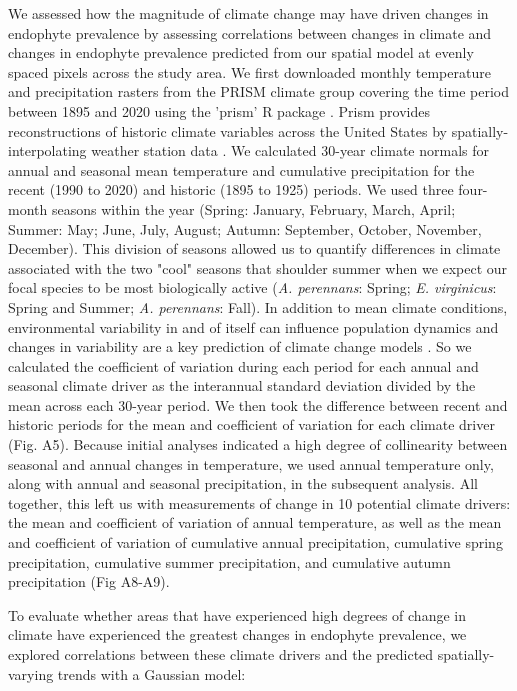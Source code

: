 \documentclass[11pt]{article}
\let\cite\citep
\begin{document}
We assessed how the magnitude of climate change may have driven changes in endophyte prevalence by assessing correlations between changes in climate and changes in endophyte prevalence predicted from our spatial model at evenly spaced pixels across the study area.
We first downloaded monthly temperature and precipitation rasters from the PRISM climate group \citep{daly2013prism} covering the time period between 1895 and 2020 using the 'prism' R package \citep{Rprism2015}. 
Prism provides reconstructions of historic climate variables across the United States by spatially-interpolating weather station data \citep{diLuzio2008constructing}. 
We calculated 30-year climate normals for annual and seasonal mean temperature and cumulative precipitation for the recent (1990 to 2020) and historic (1895 to 1925) periods.
We used three four-month seasons within the year (Spring: January, February, March, April; Summer: May; June, July, August; Autumn: September, October, November, December). 
This division of seasons allowed us to quantify differences in climate associated with the two "cool" seasons  that shoulder summer when we expect our focal species to be most biologically active (\emph{A. perennans}: Spring; \emph{E. virginicus}: Spring and Summer; \emph{A. perennans}: Fall). 
In addition to mean climate conditions, environmental variability  in and of itself can influence population dynamics \cite{tuljapurkar_population_1982} and changes in variability are a key prediction of climate change models \cite{stocker2013technical, ipcc_2021}.
So we calculated the coefficient of variation during each period for each annual and seasonal climate driver as the interannual standard deviation divided by the mean across each 30-year period.
We then took the difference between recent and historic periods for the mean and coefficient of variation for each climate driver (Fig. A5).
Because initial analyses indicated a high degree of collinearity between seasonal and annual changes in temperature, we used annual temperature only, along with annual and seasonal precipitation, in the subsequent analysis.
All together, this left us with measurements of change in 10 potential climate drivers: the mean and coefficient of variation of annual temperature, as well as the mean and coefficient of variation of cumulative annual precipitation, cumulative spring precipitation, cumulative summer precipitation, and cumulative autumn precipitation (Fig A8-A9).

To evaluate whether areas that have experienced high degrees of change in climate have experienced the greatest changes in endophyte prevalence, we explored correlations between these climate drivers and the predicted spatially-varying trends with a Gaussian model:
\end{document}

